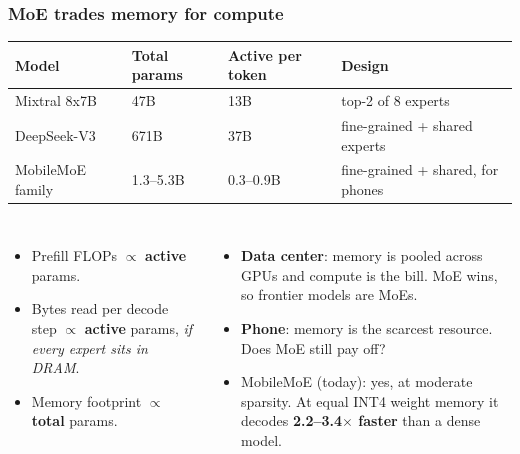 \begin{frame}
\frametitle{MoE trades memory for compute}
\centering
\small
\begin{tabular}{@{}llll@{}}
\toprule
Model & Total params & Active per token & Design \\
\midrule
Mixtral 8x7B & 47B & 13B & top-2 of 8 experts \\
DeepSeek-V3 & 671B & 37B & fine-grained + shared experts \\
MobileMoE family & 1.3--5.3B & 0.3--0.9B & fine-grained + shared, for phones \\
\bottomrule
\end{tabular}
\raggedright
\vspace{8pt}
\begin{columns}[T]
\begin{itemize}\setlength{\itemsep}{3pt}
  \item Prefill FLOPs $\propto$ \textbf{active} params.
  \item Bytes read per decode step $\propto$ \textbf{active} params, \emph{if every expert sits in DRAM}.
  \item Memory footprint $\propto$ \textbf{total} params.
\end{itemize}
\begin{itemize}\setlength{\itemsep}{3pt}
  \item \textbf{Data center}: memory is pooled across GPUs and compute is the bill. MoE wins, so frontier models are MoEs.
  \item \textbf{Phone}: memory is the scarcest resource. Does MoE still pay off?
  \item \alert{MobileMoE (today): yes, at moderate sparsity.} At equal INT4 weight memory it decodes \textbf{2.2--3.4$\times$ faster} than a dense model.
\end{itemize}
\end{columns}
\end{frame}

